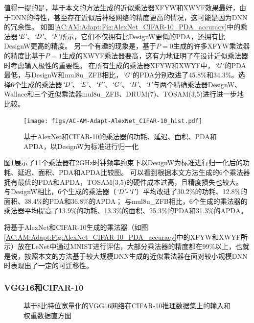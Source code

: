 值得一提的是，基于本文的方法生成的近似乘法器XFYW和XWYF效果最好，由于DNN的特性，甚至存在近似后神经网络的精度更高的情况，这可能是因为DNN的冗余性。
如图\ref{AC:AM:Adapt:Fig:AlexNet_CIFAR-10_PDA_accuracy}中的乘法器$\emph{`E'}$、$\emph{`D'}$、$\emph{`F'}$所示，它们不仅拥有比DesignW更低的PDA，还拥有比DesignW更高的精度。
另一个有趣的现象是，基于$P=0$生成的许多XFYW乘法器的精度比基于$P=1$生成的XWYF乘法器要高，这有力地证明了在设计近似乘法器时考虑输入极性的重要性。
在所有生成的乘法器XFYW和XWYF中，$\emph{`G'}$的PDA最低，与DesignW和mul8u\_ZFB相比，$\emph{`G'}$的PDA分别改进了45.8\%和34.3\%。选择6个生成的乘法器$\emph{`D'}$、$\emph{`E'}$、$\emph{`F'}$、$\emph{`G'}$、$\emph{`H'}$、$\emph{`I'}$与两个精确乘法器DesignW、Wallace和三个近似乘法器mul8u\_ZFB、DRUM(7)、TOSAM(3,5)进行进一步地比较。

\begin{figure}[!htb]
    \centering
    \texttt{[image: figs/AC-AM-Adapt-AlexNet\_CIFAR-10\_hist.pdf]}
    \caption{基于AlexNet和CIFAR-10的乘法器的功耗、延迟、面积、PDA和APDA，以DesignW为标准进行归一化}
    \label{AC:AM:Adapt:Fig:ALexNet_CIFAR-10_hist}
\end{figure}

图\ref{AC:AM:Adapt:Fig:ALexNet_CIFAR-10_hist}展示了11个乘法器在2GHz时钟频率约束下以DesignW为标准进行归一化后的功耗、延迟、面积、PDA和APDA比较图。
可以看到根据本文方法生成的6个乘法器拥有最优的PDA和APDA，TOSAM(3,5)的硬件成本过高，且精度损失也较大。
与DesignW相比，6个生成的乘法器（$\emph{`D'}$-$\emph{`I'}$）平均改进了30.2\%的功耗、12.8\%的面积、38.4\%的PDA和36.8\%的APDA；
与mul8u\_ZFB相比，6个生成的乘法器的乘法器平均提高了13.9\%的功耗、13.3\%的面积、25.3\%的PDA和31.3\%的APDA。

将基于AlexNet\cite{DNN:AlexNet}和CIFAR-10\cite{DNN:CIFAR-10}生成的乘法器（如图\ref{AC:AM:Adapt:Fig:AlexNet_CIFAR-10_PDA_accuracy}中的XFYW和XWYF所示）放在LeNet中通过MNIST进行评估，大部分乘法器的精度都在99\%以上，也就是说，按照本文的方法基于较大规模DNN生成的近似乘法器在面对较小规模DNN时表现出了一定的可迁移性。


\subsubsection{VGG16和CIFAR-10}

\begin{figure}[!h]
    \centering
    \centering
    \caption{基于8比特位宽量化的VGG16网络在CIFAR-10推理数据集上的输入和权重数据直方图}
    \label{DNN:LeNet:Fig:VGG16_CIFAR-10_distribution}
\end{figure}

